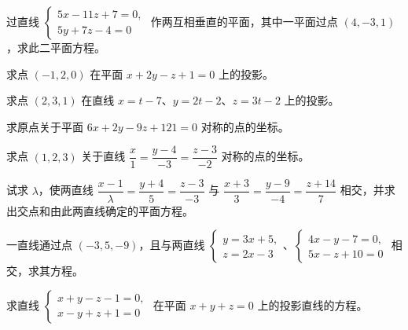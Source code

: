 \noindent\begin{minipage}{\textwidth}
过直线 $\begin{cases}5x-11z+7=0,\\5y+7z-4=0\end{cases}$ 作两互相垂直的平面，其中一平面过点 $(4,-3,1)$，求此二平面方程。
\end{minipage}\par\vfill
\noindent\begin{minipage}{\textwidth}
求点 $(-1,2,0)$ 在平面 $x+2y-z+1=0$ 上的投影。
\end{minipage}\par\vfill
\newpage
\noindent\begin{minipage}{\textwidth}
求点 $(2,3,1)$ 在直线 $x=t-7$、$y=2t-2$、$z=3t-2$ 上的投影。
\end{minipage}\par\vfill
\noindent\begin{minipage}{\textwidth}
求原点关于平面 $6x+2y-9z+121=0$ 对称的点的坐标。
\end{minipage}\par\vfill
\noindent\begin{minipage}{\textwidth}
求点 $(1,2,3)$ 关于直线 $\dfrac{x}{1}=\dfrac{y-4}{-3}=\dfrac{z-3}{-2}$ 对称的点的坐标。
\end{minipage}\par\vfill
\noindent\begin{minipage}{\textwidth}
试求 $\lambda$，使两直线 $\dfrac{x-1}{\lambda}=\dfrac{y+4}{5}=\dfrac{z-3}{-3}$ 与 $\dfrac{x+3}{3}=\dfrac{y-9}{-4}=\dfrac{z+14}{7}$ 相交，并求出交点和由此两直线确定的平面方程。
\end{minipage}\par\vfill
\newpage
\noindent\begin{minipage}{\textwidth}
一直线通过点 $(-3,5,-9)$，且与两直线 $\begin{cases}y=3x+5,\\z=2x-3\end{cases}$、$\begin{cases}4x-y-7=0,\\5x-z+10=0\end{cases}$ 相交，求其方程。
\end{minipage}\par\vfill
\noindent\begin{minipage}{\textwidth}
求直线 $\begin{cases}x+y-z-1=0,\\x-y+z+1=0\end{cases}$ 在平面 $x+y+z=0$ 上的投影直线的方程。
\end{minipage}\par\vfill
